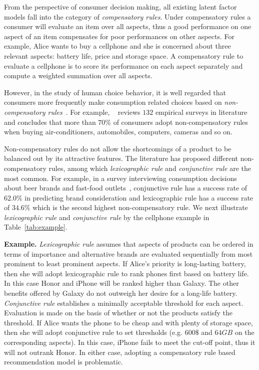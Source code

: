 \documentclass[letterpaper]{article} %
\begin{document}
From the perspective of consumer decision making, all existing latent factor models fall into the category of \emph{compensatory rules}. Under compensatory rules a consumer will evaluate an item over all aspects, thus a good performance on one aspect of an item compensates for poor performances on other aspects. For example, Alice wants to buy a cellphone and she is concerned about three relevant aspects: battery life, price and storage space. A compensatory rule to evaluate a cellphone is to score its performance on each aspect separately and compute a weighted summation over all aspects.


However, in the study of human choice behavior, it is well regarded that consumers more frequently make consumption related choices based on \emph{non-compensatory rules}~\cite{Engel1986Consumer}. For example, ~\cite{Hauser2009Non} reviews $132$ empirical surveys in literature and  concludes that more than $70\%$ of consumers adopt non-compensatory rules when buying air-conditioners, automobiles, computers, cameras and so on. 

Non-compensatory rules do not allow the shortcomings of a product to be balanced out by its attractive features. The literature has proposed different non-compensatory rules, among which  \emph{lexicographic rule} and \emph{conjunctive rule} are the most common. For example, in a survey interviewing consumption decisions about beer brands and fast-food outlets~\cite{Laroche2003Which}, conjunctive rule has a success rate of $62.0\%$ in predicting brand consideration and lexicographic rule has a success rate of $34.6\%$ which is the second highest non-compensatory rule. We next illustrate  \emph{lexicographic rule} and \emph{conjunctive rule}  by the cellphone example in Table~\ref{tab:example}. 

\textbf{Example.}  \emph{Lexicographic rule} assumes that aspects of products can be ordered in terms of importance and alternative brands are evaluated sequentially from most prominent to least prominent aspects.  If Alice's priority is long-lasting battery, then she will adopt lexicographic rule to rank phones first based on battery life. In this case Honor and iPhone will be ranked higher than Galaxy. The other benefits offered by Galaxy  do not outweigh her desire for a long-life battery. \emph{Conjunctive rule} establishes a minimally acceptable threshold for each aspect. Evaluation is made on the basis of whether or not the products satisfy the threshold. If Alice wants the phone to be cheap and with plenty of storage space, then she will adopt conjunctive rule to set thresholds (e.g. $600\$$ and $64GB$ on the corresponding aspects). In this case, iPhone fails to meet the cut-off point, thus it will not outrank Honor. In either case, adopting a compensatory rule based recommendation model is problematic. 
\end{document}

